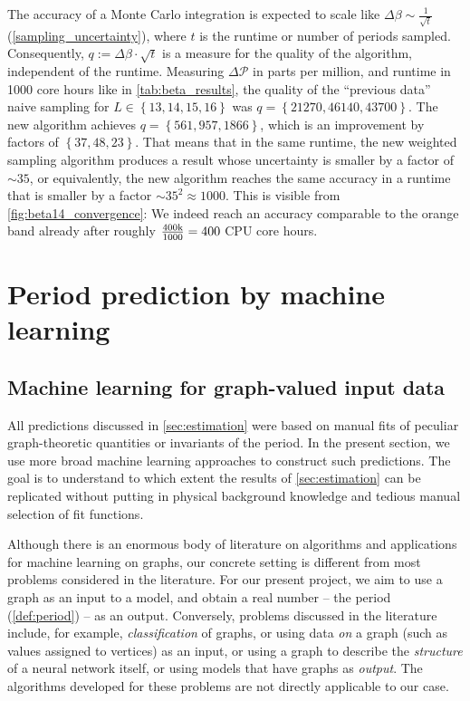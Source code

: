 \documentclass[11pt]{scrartcl}
\numberwithin{equation}{section}
\newcommand{\period}{\mathcal P}
\begin{document}
The accuracy of a Monte Carlo integration is expected to scale like $\Delta \beta \sim \frac{1}{\sqrt t}$ (\cref{sampling_uncertainty}), where $t$ is the runtime or number of periods sampled. Consequently, $q:=\Delta \beta  \cdot \sqrt t$ is a measure for the quality of the algorithm,   independent of the runtime. Measuring $\Delta \period$ in parts per million, and runtime in 1000 core hours like in \cref{tab:beta_results}, the quality of the \enquote{previous data} naive sampling for $L\in \left \lbrace 13,14,15,16 \right \rbrace $ was $q=\left \lbrace 21270,46140,43700  \right \rbrace $. The new algorithm achieves $q=\left \lbrace 561,957,1866 \right \rbrace $, which is an improvement by  factors of $\left \lbrace 37,48, 23 \right \rbrace    $. That means that in the same runtime, the new weighted sampling algorithm produces a result whose uncertainty is smaller by a factor of $\sim 35$, or equivalently, the new algorithm reaches the same  accuracy in a runtime that is smaller by a factor $\sim 35^2\approx 1000$. This is visible from  \cref{fig:beta14_convergence}: We indeed reach an accuracy comparable to the orange band already after roughly $ \frac{400 \text k}{1000}=400$ CPU core hours.







\newpage 
\section{Period prediction by machine learning}\label{sec:machine_learning}



\subsection{Machine learning for graph-valued input data} \label{sec:ML_introduction}

All predictions discussed in \cref{sec:estimation} were based on manual fits of peculiar graph-theoretic quantities or invariants of the period. In the present section, we use more broad machine learning approaches to construct such predictions. The goal is to understand to which extent the results of \cref{sec:estimation} can be replicated without putting in physical background knowledge and tedious manual selection of fit functions. 


Although there is an enormous body of literature on algorithms and applications for machine learning on graphs, our concrete setting is different from most problems considered in the literature. For our present project, we aim to use a graph as an input to a model, and obtain a real number -- the period (\cref{def:period}) -- as an output. Conversely, problems discussed in the literature include, for example, \emph{classification} of graphs, or using data \emph{on} a graph (such as values assigned to vertices) as an input, or using a graph to describe the \emph{structure} of a neural network itself, or using models that have graphs as \emph{output}. The algorithms developed for these problems are not directly applicable to our case. 
\end{document}
